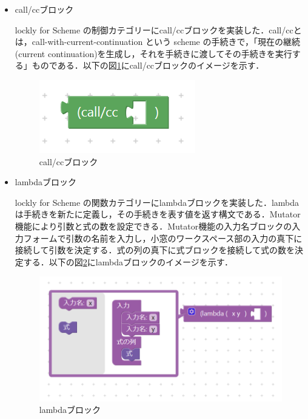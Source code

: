 \documentclass{risepaper}
\begin{document}
\begin{itemize}
\item call/ccブロック

lockly for Scheme の制御カテゴリーにcall/ccブロックを実装した．call/ccとは，call-with-current-continuation という scheme の手続きで，「現在の継続(current continuation)を生成し，それを手続きに渡してその手続きを実行する」ものである．以下の図\ref{fig:scheme_callcc}にcall/ccブロックのイメージを示す．

\begin{figure}[h]
\begin{center}
\includegraphics[scale=0.8]{img/scheme_callcc.PNG}
\caption{call/ccブロック}%
\label{fig:scheme_callcc}
\end{center}%
\end{figure}%

\item lambdaブロック

lockly for Scheme の関数カテゴリーにlambdaブロックを実装した．lambdaは手続きを新たに定義し，その手続きを表す値を返す構文である．Mutator機能により引数と式の数を設定できる．Mutator機能の入力名ブロックの入力フォームで引数の名前を入力し，小窓のワークスペース部の入力の真下に接続して引数を決定する．式の列の真下に式ブロックを接続して式の数を決定する．以下の図\ref{fig:scheme_lambda}にlambdaブロックのイメージを示す．

\begin{figure}[h]
\begin{center}
\includegraphics[scale=0.8]{img/scheme_lambda.PNG}
\caption{lambdaブロック}%
\label{fig:scheme_lambda}
\end{center}%
\end{figure}%


\end{itemize}
\end{document}
